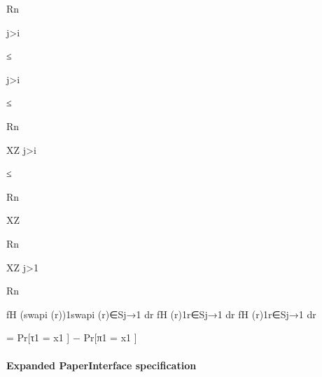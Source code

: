 \documentclass[10pt]{article}
\begin{document}
\begin{ReviewVerbatim}
Rn

j>i

≤

j>i

≤

Rn

XZ
j>i

≤

Rn

XZ

Rn

XZ
j>1

Rn

fH (swapi (r))1swapi (r)∈Sj→1 dr
fH (r)1r∈Sj→1 dr
fH (r)1r∈Sj→1 dr

= Pr[τ1 = x1 ] − Pr[π1 = x1 ]
\end{ReviewVerbatim}



\paragraph{Expanded PaperInterface specification}
\end{document}
